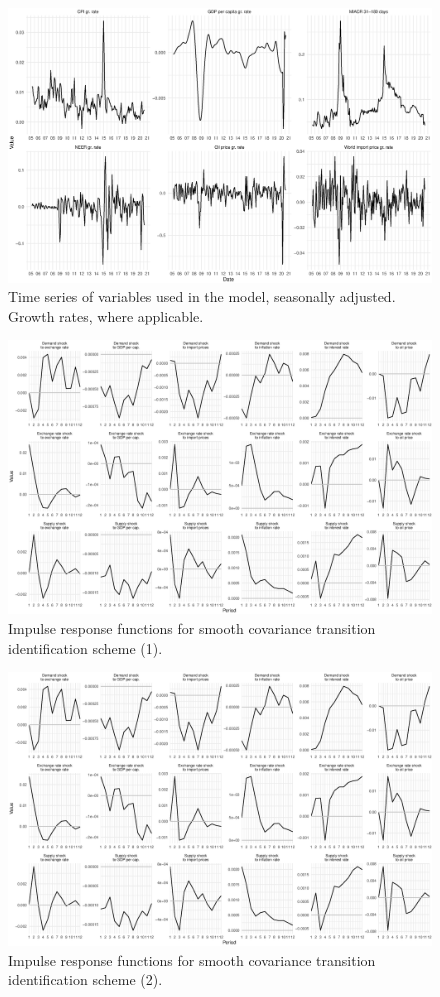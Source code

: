 \documentclass[12pt, a4paper]{extarticle}
\begin{document}
\begin{figure}
	\centering
	\includegraphics[width=0.9\linewidth]{figures/time_series}
	\caption[]{Time series of variables used in the model, seasonally adjusted. Growth rates, where applicable.}
	\label{fig:timeseries}
\end{figure}

\begin{figure}
	\centering
	\includegraphics[width=0.9\linewidth]{figures/irf_st_1}
	\caption[]{Impulse response functions for smooth covariance transition identification scheme (1).}
	\label{fig:irf_st_1}
\end{figure}

\begin{figure}
	\centering
	\includegraphics[width=0.9\linewidth]{figures/irf_st_2}
	\caption[]{Impulse response functions for smooth covariance transition identification scheme (2).}
	\label{fig:irf_st_2}
\end{figure}
\end{document}
